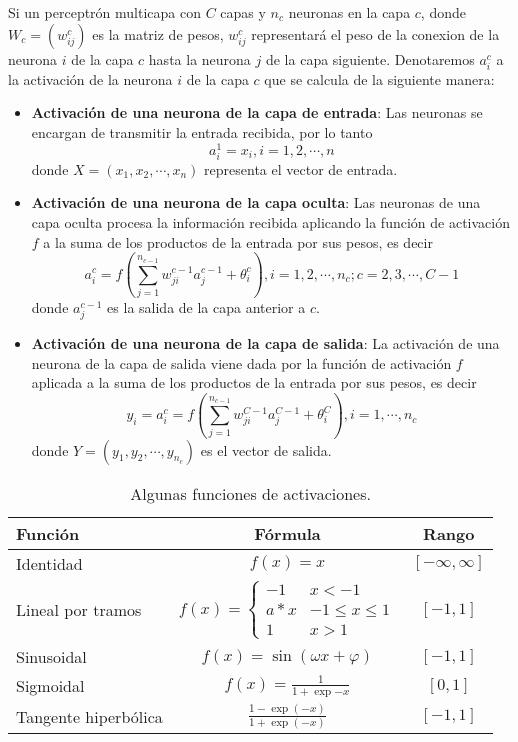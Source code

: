 Si un perceptrón multicapa con $C$ capas y $n_c$ neuronas en la capa $c$, donde $W_c = (w^{c}_{ij})$ es la matriz de pesos, $w^{c}_{ij}$ representará el peso de la conexion de la neurona $i$ de la capa $c$ hasta la neurona $j$ de la capa siguiente. Denotaremos $a^{c}_{i}$ a la activación de la neurona $i$ de la capa $c$ que se calcula de la siguiente manera:
\begin{itemize}
	\item {\bf Activación de una neurona de la capa de entrada}: Las neuronas se encargan de transmitir la entrada recibida, por lo tanto $$ a^{1}_{i} = x_{i}, i = 1, 2, \cdots, n$$ donde $X = (x_1, x_2, \cdots, x_n)$ representa el vector de entrada.

	\item {\bf Activación de una neurona de la capa oculta}: Las neuronas de una capa oculta procesa la información recibida aplicando la función de activación $f$ a la suma de los productos de la entrada por sus pesos, es decir $$ a^{c}_{i} = f\left(\sum^{n_{c - 1}}_{j=1} w^{c - 1}_{ji}a^{c - 1}_{j} + \theta^{c}_{i}\right), i = 1, 2, \cdots, n_c; c = 2, 3, \cdots, C - 1$$ donde $a^{c - 1}_{j}$ es la salida de la capa anterior a $c$.

	\item {\bf Activación de una neurona de la capa de salida}: La activación de una neurona de la capa de salida viene dada por la función de activación $f$ aplicada a la suma de los productos de la entrada por sus pesos, es decir $$ y_{i} = a^{c}_{i} = f\left(\sum^{n_{c - 1}}_{j=1} w^{C - 1}_{ji}a^{C - 1}_{j} + \theta^{C}_{i}\right), i = 1, \cdots, n_c$$ donde $Y = (y_1, y_2, \cdots, y_{n_{c}})$ es el vector de salida.
\end{itemize}

\begin{table}[H]
	\centering
	\begin{tabular}{|l|c|c|}\hline
		{\bf Función}	& {\bf Fórmula}	& {\bf Rango}\\\hline
		Identidad & $f(x) = x$	& $[-\infty, \infty]$\\\hline
		Lineal por tramos &
		$f(x) = \left\{
		\begin{array}{ll}
			-1		& x < -1\\
			a*x		& -1 \leq x \leq 1\\
			1		& x > 1
		\end{array}
		\right. $	& $[-1, 1]$\\\hline
		Sinusoidal	& $ f(x) = \sin(\omega x + \varphi) $	& $[-1, 1]$\\\hline
		Sigmoidal	& $f(x) = \frac{1}{1 + \exp{-x}}$	& $[0, 1]$\\\hline
		Tangente hiperbólica	& $\frac{1 - \exp(-x)}{1 + \exp(-x)}$	& $[-1, 1]$\\\hline
	\end{tabular}
	\caption{Algunas funciones de activaciones.}
	\label{tab:f_activacion}
\end{table}

